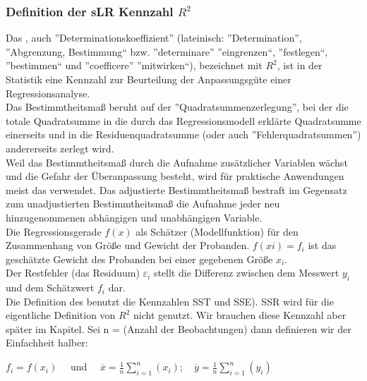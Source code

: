 \documentclass[12pt]{article}
\begin{document}
\subsubsection{Definition der sLR Kennzahl $ R^2 $}
%
Das {\color{blue}{Bestimmtheitsmaß $R^2$}} , auch ”Determinationskoeffizient” (lateinisch: ”Determination”, ”Abgrenzung, Bestimmung“ bzw. ”determinare” ”eingrenzen“, ”festlegen“, ”bestimmen“ und ”coefficere” ”mitwirken“), bezeichnet mit $R^2$, ist in der Statistik eine Kennzahl zur Beurteilung der Anpassungsgüte einer Regressionsanalyse.\\
Das Bestimmtheitsmaß beruht auf der ”Quadratsummenzerlegung”, bei der die totale Quadratsumme in die durch das Regressionsmodell erklärte Quadratsumme einerseits und in die Residuenquadratsumme (oder auch ”Fehlerquadratsummen”) andererseits zerlegt wird.\\[0.2cm]
Weil das Bestimmtheitsmaß durch die Aufnahme zusätzlicher Variablen wächst und
die Gefahr der Überanpassung besteht, wird für praktische Anwendungen meist das
{\color{blue}{adjustierte Bestimmtheitsmaß $Adj.R^2$}}  verwendet. Das adjustierte Bestimmtheitsmaß bestraft im Gegensatz zum unadjustierten Bestimmtheitsmaß die Aufnahme jeder neu hinzugenommenen abhängigen und unabhängigen Variable.\\[0.2cm]
Die Regressionsgerade $f(x)$ als Schätzer (Modellfunktion) für den Zusammenhang von
Größe und Gewicht der Probanden. $f(xi) = f_i $  ist das geschätzte Gewicht des
Probanden bei einer gegebenen Größe $x_i$.\\[0.2cm]
Der Restfehler (das Residuum) $\varepsilon_i$ stellt die Differenz zwischen dem Messwert $y_i$ und dem Schätzwert $f_i$ dar.\\[0.2cm]
%
Die Definition des {\color{blue}{Bestimmtheitsmaß $R^2$}}  benutzt die Kennzahlen SST und SSE). SSR wird für die eigentliche Definition von $R^2$ nicht genutzt. Wir brauchen diese Kennzahl aber später im Kapitel. Sei n = (Anzahl der Beobachtungen) dann definieren wir der Einfachheit halber: 
\begin{center}
$ f_i = f(x_i)\quad $ und $ \quad \overline{x} = \frac{1}{n} \sum\limits_{i=1}^n (x_i) ; \quad \overline{y} = \frac{1}{n} \sum\limits_{i=1}^n (y_i) $\\
\end{center} 
\end{document}
